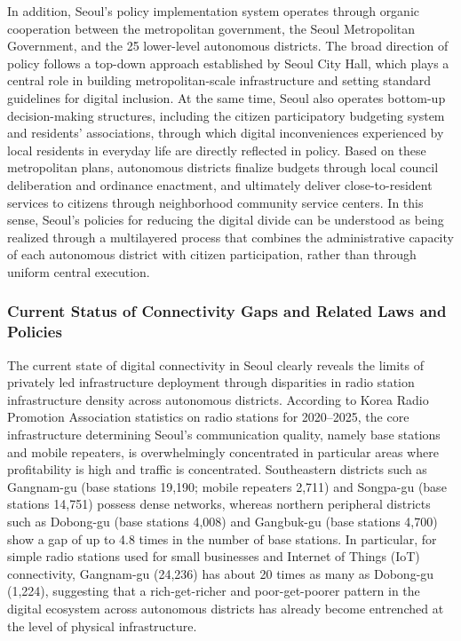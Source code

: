 In addition, Seoul's policy implementation system operates through organic cooperation between the metropolitan government, the Seoul Metropolitan Government, and the 25 lower-level autonomous districts. The broad direction of policy follows a top-down approach established by Seoul City Hall, which plays a central role in building metropolitan-scale infrastructure and setting standard guidelines for digital inclusion. At the same time, Seoul also operates bottom-up decision-making structures, including the citizen participatory budgeting system and residents' associations, through which digital inconveniences experienced by local residents in everyday life are directly reflected in policy. Based on these metropolitan plans, autonomous districts finalize budgets through local council deliberation and ordinance enactment, and ultimately deliver close-to-resident services to citizens through neighborhood community service centers. In this sense, Seoul's policies for reducing the digital divide can be understood as being realized through a multilayered process that combines the administrative capacity of each autonomous district with citizen participation, rather than through uniform central execution.

\subsubsection{Current Status of Connectivity Gaps and Related Laws and Policies}
\label{subsubsec:2-2-2}

The current state of digital connectivity in Seoul clearly reveals the limits of privately led infrastructure deployment through disparities in radio station infrastructure density across autonomous districts. According to Korea Radio Promotion Association statistics on radio stations for 2020--2025, the core infrastructure determining Seoul's communication quality, namely base stations and mobile repeaters, is overwhelmingly concentrated in particular areas where profitability is high and traffic is concentrated. Southeastern districts such as Gangnam-gu (base stations 19,190; mobile repeaters 2,711) and Songpa-gu (base stations 14,751) possess dense networks, whereas northern peripheral districts such as Dobong-gu (base stations 4,008) and Gangbuk-gu (base stations 4,700) show a gap of up to 4.8 times in the number of base stations. In particular, for simple radio stations used for small businesses and Internet of Things (IoT) connectivity, Gangnam-gu (24,236) has about 20 times as many as Dobong-gu (1,224), suggesting that a rich-get-richer and poor-get-poorer pattern in the digital ecosystem across autonomous districts has already become entrenched at the level of physical infrastructure.

